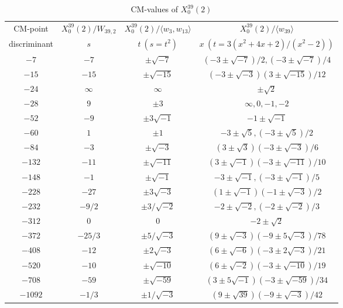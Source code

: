 \documentclass{amsart}
\theoremstyle{definition}
\def\gen#1{\langle #1\rangle}
\begin{document}
\begin{appendices}
\begin{table}
\end{table}
\clearpage

\renewcommand{\arraystretch}{1.5}
\tabcolsep=10pt                         
\begin{table}
\begin{tabular}{|c|c|c|c|}
\hline
CM-point& $X_{0}^{39}(2) /W_{39,2}$ & $X_{0}^{39}(2)/\gen{w_3,w_{13}}$
  & $X_0^{39}(2)/\gen{w_{39}}$ \\ 
discriminant & $s$ & $t\ (s=t^2)$ & $x\ (t=3(x^2+4x+2)/(x^2-2))$ \\
  \hline
$-7$ & $-7$ & $\pm\sqrt{-7}$ & $(-3\pm\sqrt{-7})/2,(-3\pm\sqrt{-7})/4$ \\
$-15$ & $-15$ & $\pm\sqrt{-15}$ & $(-3\pm\sqrt{-3})(3\pm\sqrt{-15})/12$ \\
$-24$ & $\infty$ & $\infty$ & $\pm\sqrt2$ \\
$-28$ & $9$ & $\pm3$ & $\infty,0,-1,-2$ \\
$-52$ & $-9$ & $\pm3\sqrt{-1}$ & $-1\pm\sqrt{-1}$ \\
$-60$ & $1$ & $\pm 1$ & $-3\pm\sqrt5,(-3\pm\sqrt5)/2$ \\
$-84$ & $-3$ & $\pm\sqrt{-3}$ & $(3\pm\sqrt3)(-3\pm\sqrt{-3})/6$ \\
$-132$ & $-11$ & $\pm\sqrt{-11}$
      & $(3\pm\sqrt{-1})(-3\pm\sqrt{-11})/10$ \\
$-148$ & $-1$ & $\pm\sqrt{-1}$ & $-3\pm\sqrt{-1},(-3\pm\sqrt{-1})/5$
  \\
$-228$ & $-27$ & $\pm3\sqrt{-3}$ & $(1\pm\sqrt{-1})(-1\pm\sqrt{-3})/2$
  \\
$-232$ & $-9/2$ & $\pm3/\sqrt{-2}$ & $-2\pm\sqrt{-2},(-2\pm\sqrt{-2})/3$
  \\
$-312$ & $0$ & $0$ & $-2\pm\sqrt2$ \\
$-372$ & $-25/3$ & $\pm 5/\sqrt{-3}$
       & $(9\pm\sqrt{-3})(-9\pm5\sqrt{-3})/78$ \\
$-408$ & $-12$ & $\pm2\sqrt{-3}$
       & $(6\pm\sqrt{-6})(-3\pm2\sqrt{-3})/21$ \\
$-520$ & $-10$ & $\pm\sqrt{-10}$
       & $(6\pm\sqrt{-2})(-3\pm\sqrt{-10})/19$ \\
$-708$ & $-59$ & $\pm\sqrt{-59}$
       & $(3\pm5\sqrt{-1})(-3\pm\sqrt{-59})/34$ \\
$-1092$ & $-1/3$ & $\pm1/\sqrt{-3}$
       & $(9\pm\sqrt{39})(-9\pm\sqrt{-3})/42$ \\
\hline
\end{tabular}
\bigskip
\caption{CM-values of $X^{39}_0(2)$}
\end{table}
\clearpage

\end{appendices}
\end{document}
